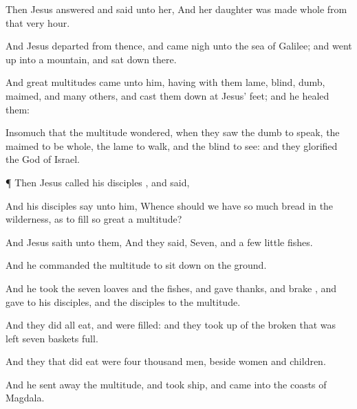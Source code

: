 {Then
Jesus
answered and
said unto
her,
{}
And
her
daughter was made
whole
from that
very
hour.

And
Jesus
departed from
thence, and
came
nigh unto the
sea of
Galilee;
and went
up
into a
mountain, and sat
down
there.

And
great
multitudes came
unto
him,
having
with
them
{}
lame,
blind,
dumb,
maimed,
and
many
others,
and
cast
them
down
at
Jesus’
feet;
and he
healed
them:

Insomuch
that the
multitude
wondered, when they
saw the
dumb to
speak, the
maimed to be
whole, the
lame to
walk,
and the
blind to
see:
and they
glorified the
God of
Israel.


\par }{\PP {}¶
Then
Jesus
called
his
disciples
{}, and
said,
{}

And
his
disciples
say unto
him,
Whence should we
have so
much
bread
in the
wilderness,
as to
fill so
great a
multitude?

And
Jesus
saith unto
them,
{}
And they
said,
Seven,
and a
few little
fishes.

And he
commanded the
multitude to sit
down
on the
ground.

And he
took
the
seven
loaves
and the
fishes, and gave
thanks, and
brake
{},
and
gave
to
his
disciples,
and the
disciples to the
multitude.

And they
did
all
eat,
and were
filled:
and they took
up of the
broken
{} that was
left
seven
baskets
full.

And they that did
eat
were four
thousand
men,
beside
women
and
children.

And he sent
away the
multitude, and
took
ship,
and
came
into the
coasts of
Magdala.




\par }
